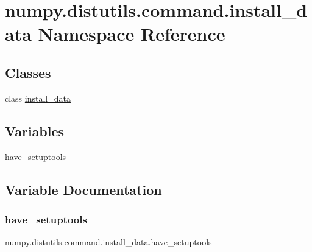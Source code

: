 \hypertarget{namespacenumpy_1_1distutils_1_1command_1_1install__data}{}\section{numpy.\+distutils.\+command.\+install\+\_\+data Namespace Reference}
\label{namespacenumpy_1_1distutils_1_1command_1_1install__data}
\subsection*{Classes}
\begin{DoxyCompactItemize}
\item 
class \hyperlink{classnumpy_1_1distutils_1_1command_1_1install__data_1_1install__data}{install\+\_\+data}
\end{DoxyCompactItemize}
\subsection*{Variables}
\begin{DoxyCompactItemize}
\item 
\hyperlink{namespacenumpy_1_1distutils_1_1command_1_1install__data_ad84bd972698340de834c0f90627cd4f6}{have\+\_\+setuptools}
\end{DoxyCompactItemize}


\subsection{Variable Documentation}
\mbox{\label{namespacenumpy_1_1distutils_1_1command_1_1install__data_ad84bd972698340de834c0f90627cd4f6}} 
\subsubsection{\texorpdfstring{have\+\_\+setuptools}{have\_setuptools}}
{\footnotesize\ttfamily numpy.\+distutils.\+command.\+install\+\_\+data.\+have\+\_\+setuptools}

